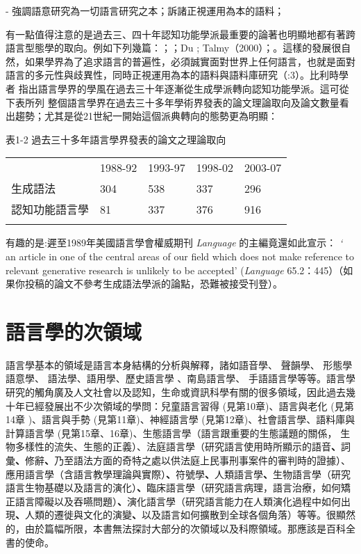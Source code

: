 {}-  強調語意研究為一切語言研究之本；訴諸正視運用為本的語料；

有一點值得注意的是過去三、四十年認知功能學派最重要的論著也明顯地都有著跨語言型態學的取向。例如下列幾篇：\citet{Givon1979}；\citet{HopperThompson1980}；Du \citet{Bois1987}; Talmy（2000）；\citet{Bybee2010}。這樣的發展很自然，如果學界為了追求語言的普遍性，必須誠實面對世界上任何語言，也就是面對語言的多元性與歧異性，同時正視運用為本的語料與語料庫研究（\citealt{Langacker1987}:3）。比利時學者\citet{Geeraerts2010} 指出語言學界的學風在過去三十年逐漸從生成學派轉向認知功能學派。這可從下表所列 整個語言學界在過去三十多年學術界發表的論文理論取向及論文數量看出趨勢；尤其是從21世紀一開始這個派典轉向的態勢更為明顯：

表1-2  過去三十多年語言學界發表的論文之理論取向

\tablefirsthead{}

\tabletail{}
\tablelasttail{}
\begin{tabularx}{\textwidth}{XXXXX} & 1988-92 & 1993-97 & 1998-02 & 2003-07\\
\lsptoprule
生成語法 & 304 & 538 & 337 & 296\\
認知功能語言學 & 81 & 337 & 376 & 916\\
\lspbottomrule
\end{tabularx}
有趣的是:遲至1989年美國語言學會權威期刊 \textit{Language} 的主編竟還如此宣示： \textit{‘} an article in one of the central areas of our field which does not make reference to relevant generative research is unlikely to be accepted’ (\textit{Language} 65.2：445）（如果你投稿的論文不參考生成語法學派的論點，恐難被接受刊登）。

\section{語言學的次領域} %

語言學基本的領域是語言本身結構的分析與解釋，諸如語音學、 聲韻學、 形態學語意學、 語法學、語用學、歷史語言學 、南島語言學、 手語語言學等等。語言學研究的觸角廣及人文社會以及認知，生命或資訊科學有關的很多領域，因此過去幾十年已經發展出不少次領域的學問：兒童語言習得 (見第10章)、語言與老化 (見第14章 )、語言與手勢 (見第11章)、神經語言學 (見第12章)、社會語言學、語料庫與計算語言學 (見第15章、16章)、生態語言學（語言跟重要的生態議題的關係， 生物多樣性的流失、生態的正義）、法庭語言學（研究語言使用時所顯示的語音\textbf{、}詞彙\textbf{、}修辭\textbf{、}乃至語法方面的奇特之處以供法庭上民事刑事案件的審判時的證據）、應用語言學（含語言教學理論與實際）\textbf{、}符號學\textbf{、}人類語言學\textbf{、}生物語言學（研究語言生物基礎以及語言的演化）\textbf{、}臨床語言學（研究語言病理，語言治療，如何矯正語言障礙以及吞嚥問題）\textbf{、}演化語言學（研究語言能力在人類演化過程中如何出現\textbf{、}人類的遷徙與文化的演變\textbf{、}以及語言如何擴散到全球各個角落）等等。很顯然的，由於篇幅所限，本書無法探討大部分的次領域以及科際領域。那應該是百科全書的使命。

